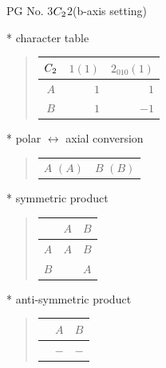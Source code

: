 \documentclass[fleqn,8pt,landscape]{jsarticle}
\begin{document}
\setcounter{MaxMatrixCols}{32}

\renewcommand{\tablename}{Table~}
\renewcommand{\figurename}{Figure~}
\begin{center}
\LARGE
PG No. 3\quad$C_{\rm 2}$\quad$2$\quad(b-axis setting)\quad[ monoclinic ]
\end{center}

* character table
\begin{quote}
\begin{tabular}{crr} \hline \hline
$ C_{\rm 2} $ & $ 1(1) $ & $ 2{}_{010}(1) $ \\ \hline
$ A $ & $ 1 $ & $ 1 $ \\
$ B $ & $ 1 $ & $ -1 $ \\
 \hline \hline
\end{tabular}
\end{quote}

* polar $\leftrightarrow$ axial conversion
\begin{quote}
\begin{tabular}{cc}
$ A\,\,(A) $ & $ B\,\,(B) $
\end{tabular}
\end{quote}

* symmetric product
\begin{quote}
\begin{tabular}{c|cc} \hline \hline
 & $ A $ & $ B $ \\ \hline
$ A $ & $ A $ & $ B $ \\
$ B $ & $  $ & $ A $ \\
 \hline \hline
\end{tabular}
\end{quote}

* anti-symmetric product
\begin{quote}
\begin{tabular}{ccc} \hline \hline
 & $ A $ & $ B $ \\ \hline
$  $ & $ - $ & $ - $ \\
 \hline \hline
\end{tabular}
\end{quote}
\end{document}
